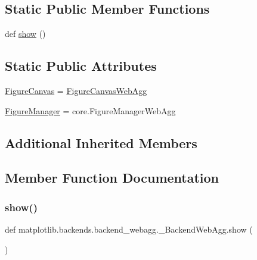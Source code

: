 \subsection*{Static Public Member Functions}
\begin{DoxyCompactItemize}
\item 
def \hyperlink{classmatplotlib_1_1backends_1_1backend__webagg_1_1__BackendWebAgg_ae5a2405d311c1eaa9766d84855e98c9b}{show} ()
\end{DoxyCompactItemize}
\subsection*{Static Public Attributes}
\begin{DoxyCompactItemize}
\item 
\hyperlink{classmatplotlib_1_1backends_1_1backend__webagg_1_1__BackendWebAgg_a2b7d8d967616b62d8be17554c42932fe}{Figure\+Canvas} = \hyperlink{classmatplotlib_1_1backends_1_1backend__webagg_1_1FigureCanvasWebAgg}{Figure\+Canvas\+Web\+Agg}
\item 
\hyperlink{classmatplotlib_1_1backends_1_1backend__webagg_1_1__BackendWebAgg_af6a065ac39f9468a787c7bee2985611a}{Figure\+Manager} = core.\+Figure\+Manager\+Web\+Agg
\end{DoxyCompactItemize}
\subsection*{Additional Inherited Members}


\subsection{Member Function Documentation}
\mbox{\label{classmatplotlib_1_1backends_1_1backend__webagg_1_1__BackendWebAgg_ae5a2405d311c1eaa9766d84855e98c9b}} 
\subsubsection{\texorpdfstring{show()}{show()}}
{\footnotesize\ttfamily def matplotlib.\+backends.\+backend\+\_\+webagg.\+\_\+\+Backend\+Web\+Agg.\+show (\begin{DoxyParamCaption}{ }\end{DoxyParamCaption})\hspace{0.3cm}{\ttfamily [static]}}



